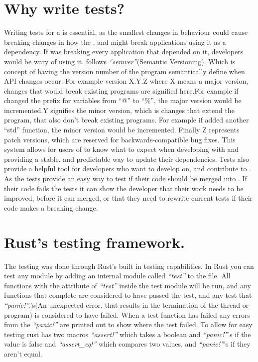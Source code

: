 \section{Why write tests?}
Writing tests for a \compiler{} is essential, as the smallest changes in behaviour could cause breaking changes in how the \compiler{}, and might break applications using it as a dependency. If \languageName{} was breaking every application that depended on it, developers would be wary of using it. \languageName{} follows \textit{``semver''}(Semantic Versioning)\cite{semver}. Which is concept of having the version number of the program semantically define when API changes occur. For example \languageName{} version X.Y.Z where X means a major version, changes that would break existing programs are signified here.For example if \languageName{} changed the prefix for variables from ``@'' to ``\%'', the major version would be incremented.Y signifies the minor version, which is changes that extend the program, that also don't break existing programs. For example if \languageName{} added another ``std'' function, the minor version would be incremented. Finally Z represents patch versions, which are reserved for backwards-compatible bug fixes. This system allows for users of \languageName{} to know what to expect when developing with \languageName{} and providing a stable, and predictable way to update their dependencies.
\newpage
Tests also provide a helpful tool for developers who want to develop on, and contribute to \languageName{}. As the tests provide an easy way to test if their code should be merged into \languageName{}. If their code fails the tests it can show the developer that their work needs to be improved, before it can merged, or that they need to rewrite current tests if their code makes a breaking change.

\section{Rust's testing framework.}
The testing was done through Rust's built in testing capabilities. In Rust you can test any module by adding an internal module called \textit{``test''} to the file. All functions with the attribute of \textit{``test''} inside the test module will be run, and any functions that complete are considered to have passed the test, and any test that \textit{``panic!''.}'s(An unexpected error, that results in the termination of the thread or program) is considered to have failed. When a test function has failed any errors from the \textit{``panic!''} are printed out to show where the test failed. To allow for easy testing rust has two macros \textit{``assert!''} which takes a boolean and \textit{``panic!''}'s if the value is false and \textit{``assert\_eq!''} which compares two values, and \textit{``panic!''}'s if they aren't equal.
\newpage
